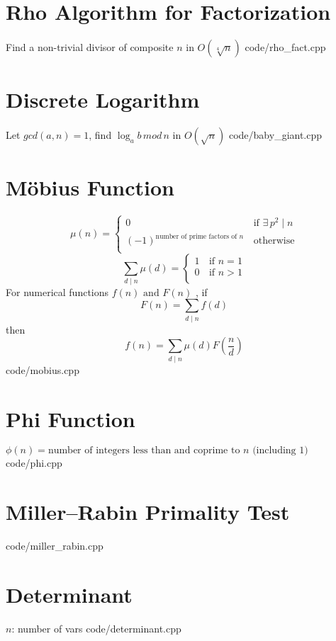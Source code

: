 \documentclass [landscape,8pt,a4paper,twocolumn]{article}
\begin{document}
\section{Rho Algorithm for Factorization}
Find a non-trivial divisor of composite $ n $ in $ O(\sqrt[4]{n}) $
 {code/rho_fact.cpp}

\section{Discrete Logarithm}
Let $ gcd(a, n)=1 $, find $ \log_{a}{b} \, mod \, n $ in $ O(\sqrt{n}) $
 {code/baby_giant.cpp}

\section{Möbius Function}
\[\mu (n) =
 	\begin{cases}
		0	& \, \text{if } \exists \, p^2 \mid n \\
		(-1)^{\text{number of prime factors of } n}	& \, \text{otherwise} \\
	\end{cases}
\]
\[\sum_{d \mid n} \mu(d) =
	\begin{cases}
    	1	& \, \text{if } n=1 \\
        0	& \, \text{if } n>1 \\
	\end{cases}
\]
For numerical functions $ f(n) \text{ and } F(n) $ , if
\[
	F(n)=\sum_{d \mid n}f(d)
\]
then
\[
	f(n)=\sum_{d \mid n}\mu(d)F(\frac{n}{d})
\]
 {code/mobius.cpp}


\section{Phi Function}
$ \phi(n)= \text{number of integers less than and coprime to } n \text{ (including } 1) $
 {code/phi.cpp}

\section{Miller–Rabin Primality Test}
 {code/miller_rabin.cpp}

\section{Determinant}
$ n $: number of vars
 {code/determinant.cpp}
\end{document}
